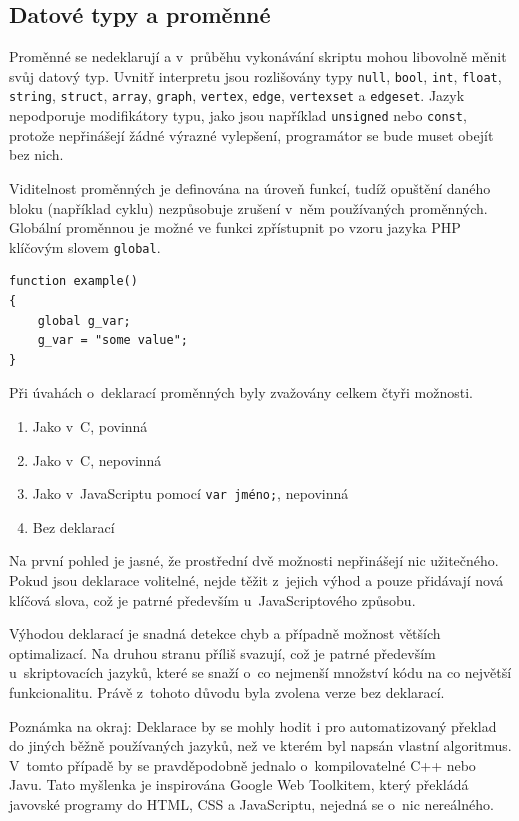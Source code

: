 \documentclass[11pt,twoside,a4paper]{book}
\begin{document}
\subsection{Datové typy a proměnné}
\label{datove_typy_a_promenne}

Proměnné se nedeklarují a v~průběhu vykonávání skriptu mohou libovolně měnit svůj datový typ. Uvnitř interpretu jsou rozlišovány typy \texttt{null}, \texttt{bool}, \texttt{int}, \texttt{float}, \texttt{string}, \texttt{struct}, \texttt{array}, \texttt{graph}, \texttt{vertex}, \texttt{edge}, \texttt{vertexset} a \texttt{edgeset}. Jazyk nepodporuje modifikátory typu, jako jsou například \texttt{unsigned} nebo \texttt{const}, protože nepřinášejí žádné výrazné vylepšení, programátor se bude muset obejít bez nich.

Viditelnost proměnných je definována na úroveň funkcí, tudíž opuštění daného bloku (na\-pří\-klad cyklu) nezpůsobuje zrušení v~něm používaných proměnných. Globální pro\-měn\-nou je možné ve funkci zpřístupnit po vzoru jazyka PHP klíčovým slovem \texttt{global}.

\begin{verbatim}
function example()
{
    global g_var;
    g_var = "some value";
}
\end{verbatim}

Při úvahách o~deklarací proměnných byly zvažovány celkem čtyři možnosti.

\begin{enumerate}
\item Jako v~C, povinná
\item Jako v~C, nepovinná
\item Jako v~JavaScriptu pomocí \texttt{var jméno;}, nepovinná
\item Bez deklarací
\end{enumerate}

Na první pohled je jasné, že prostřední dvě možnosti nepřinášejí nic užitečného. Pokud jsou deklarace volitelné, nejde těžit z~jejich výhod a pouze přidávají nová klíčová slova, což je patrné především u~JavaScriptového způsobu.

Výhodou deklarací je snadná detekce chyb a případně možnost větších optimalizací. Na druhou stranu příliš svazují, což je patrné především u~skriptovacích jazyků, které se snaží o~co nejmenší množství kódu na co největší funkcionalitu. Právě z~tohoto důvodu byla zvolena verze bez deklarací.

Poznámka na okraj: Deklarace by se mohly hodit i pro automatizovaný překlad do jiných běžně používaných jazyků, než ve kterém byl napsán vlastní algoritmus. V~tomto případě by se pravděpodobně jednalo o~kompilovatelné C++ nebo Javu. Tato myšlenka je inspirována Google Web Toolkitem, který překládá javovské programy do HTML, CSS a JavaScriptu, nejedná se o~nic nereálného.
\end{document}

